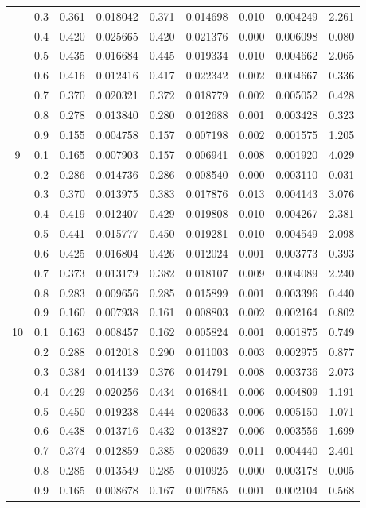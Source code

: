 \begin{longtable}{ | c | c || c | c | c | c | c | c | c | }
 & 0.3 & 0.361 & 0.018042 & 0.371 & 0.014698 & 0.010 & 0.004249 & 2.261 \\
 & 0.4 & 0.420 & 0.025665 & 0.420 & 0.021376 & 0.000 & 0.006098 & 0.080 \\
 & 0.5 & 0.435 & 0.016684 & 0.445 & 0.019334 & 0.010 & 0.004662 & 2.065 \\
 & 0.6 & 0.416 & 0.012416 & 0.417 & 0.022342 & 0.002 & 0.004667 & 0.336 \\
 & 0.7 & 0.370 & 0.020321 & 0.372 & 0.018779 & 0.002 & 0.005052 & 0.428 \\
 & 0.8 & 0.278 & 0.013840 & 0.280 & 0.012688 & 0.001 & 0.003428 & 0.323 \\
 & 0.9 & 0.155 & 0.004758 & 0.157 & 0.007198 & 0.002 & 0.001575 & 1.205 \\
 \hline
\multirow{9}{*}{9} & 0.1 & 0.165 & 0.007903 & 0.157 & 0.006941 & 0.008 & 0.001920 & 4.029 \\
 & 0.2 & 0.286 & 0.014736 & 0.286 & 0.008540 & 0.000 & 0.003110 & 0.031 \\
 & 0.3 & 0.370 & 0.013975 & 0.383 & 0.017876 & 0.013 & 0.004143 & 3.076 \\
 & 0.4 & 0.419 & 0.012407 & 0.429 & 0.019808 & 0.010 & 0.004267 & 2.381 \\
 & 0.5 & 0.441 & 0.015777 & 0.450 & 0.019281 & 0.010 & 0.004549 & 2.098 \\
 & 0.6 & 0.425 & 0.016804 & 0.426 & 0.012024 & 0.001 & 0.003773 & 0.393 \\
 & 0.7 & 0.373 & 0.013179 & 0.382 & 0.018107 & 0.009 & 0.004089 & 2.240 \\
 & 0.8 & 0.283 & 0.009656 & 0.285 & 0.015899 & 0.001 & 0.003396 & 0.440 \\
 & 0.9 & 0.160 & 0.007938 & 0.161 & 0.008803 & 0.002 & 0.002164 & 0.802 \\
 \hline
\multirow{9}{*}{10} & 0.1 & 0.163 & 0.008457 & 0.162 & 0.005824 & 0.001 & 0.001875 & 0.749 \\
 & 0.2 & 0.288 & 0.012018 & 0.290 & 0.011003 & 0.003 & 0.002975 & 0.877 \\
 & 0.3 & 0.384 & 0.014139 & 0.376 & 0.014791 & 0.008 & 0.003736 & 2.073 \\
 & 0.4 & 0.429 & 0.020256 & 0.434 & 0.016841 & 0.006 & 0.004809 & 1.191 \\
 & 0.5 & 0.450 & 0.019238 & 0.444 & 0.020633 & 0.006 & 0.005150 & 1.071 \\
 & 0.6 & 0.438 & 0.013716 & 0.432 & 0.013827 & 0.006 & 0.003556 & 1.699 \\
 & 0.7 & 0.374 & 0.012859 & 0.385 & 0.020639 & 0.011 & 0.004440 & 2.401 \\
 & 0.8 & 0.285 & 0.013549 & 0.285 & 0.010925 & 0.000 & 0.003178 & 0.005 \\
 & 0.9 & 0.165 & 0.008678 & 0.167 & 0.007585 & 0.001 & 0.002104 & 0.568 \\
 \hline
\hline
\end{longtable}
 
